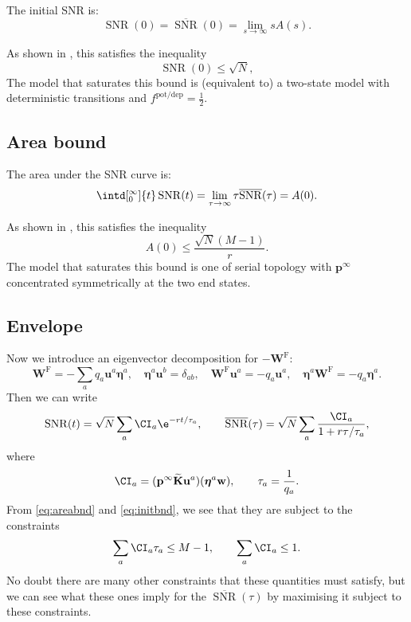 \documentclass[12pt]{article}
\newcommand{\pr}{\mathbf{p}}
\newcommand{\eq}{\pr^\infty}
\newcommand{\w}{\mathbf{w}}
\newcommand{\W}{\mathbf{W}}
\newcommand{\enc}{\mathbf{K}}
\newcommand{\frg}{\W^{\mathrm{F}}}
\newcommand{\potdep}{^{\text{pot/dep}}}
\newcommand{\ench}{\widetilde{\enc}}
\newcommand{\evr}{\mathbf{u}}
\newcommand{\evl}{\boldsymbol{\eta}}
\DeclareMathOperator{\snr}{SNR}
\newcommand{\snrb}{\overline{\snr}}
\begin{document}
The initial SNR is:
%
\begin{equation}\label{eq:initdef}
  \snr(0) = \snrb(0) = \lim_{s\to\infty} sA(s).
\end{equation}
%

As shown in \cite{Lahiri2013synapse}, this satisfies the inequality
%
\begin{equation}\label{eq:initbnd}
  \snr(0) \leq \sqrt{N},
\end{equation}
%
The model that saturates this bound is (equivalent to) a two-state model with deterministic transitions and $f\potdep=\frac{1}{2}$.

\subsection{Area bound}\label{sec:area}

The area under the SNR curve is:
%
\begin{equation}\label{eq:areadef}
  \intd[_0^\infty]{t} \snr(t) = \lim_{\tau\to\infty} \tau \snrb(\tau) = A(0).
\end{equation}
%

As shown in \cite{Lahiri2013synapse}, this satisfies the inequality
%
\begin{equation}\label{eq:areabnd}
  A(0) \leq \frac{\sqrt{N}(M-1)}{r}.
\end{equation}
%
The model that saturates this bound is one of serial topology with $\eq$ concentrated symmetrically at the two end states.



\subsection{Envelope}\label{sec:envelope}

Now we introduce an eigenvector decomposition for $-\frg$:
%
\begin{equation}\label{eq:eigendecomp}
  \frg = - \sum_a q_a \evr^a \evl^a,
  \quad
  \evl^a \evr^b = \delta_{ab},
  \quad
  \frg \evr^a = -q_a \evr^a,
  \quad
  \evl^a \frg = -q_a \evl^a.
\end{equation}
%
Then we can write
%
\begin{equation}\label{eqsnreig}
  \snr(t) = \sqrt{N}\sum_a \CI_a \e^{-rt/\tau_a},
  \qquad
  \snrb(\tau) = \sqrt{N}\sum_a \frac{\CI_a}{1+r\tau/\tau_a},
\end{equation}
%
where
%
\begin{equation}\label{eq:snrcoeffs}
  \CI_a = (\eq \ench \evr^a) (\evl^a \w),
  \qquad
  \tau_a = \frac{1}{q_a}.
\end{equation}
%
From \eqref{eq:areabnd} and \eqref{eq:initbnd}, we see that they are subject to the constraints
%
\begin{equation}\label{eq:coeffconstr}
  \sum_a \CI_a \tau_a \leq M-1,
  \qquad
  \sum_a \CI_a \leq 1.
\end{equation}
%
No doubt there are many other constraints that these quantities must satisfy, but we can see what these ones imply for the $\snrb(\tau)$ by maximising it subject to these constraints.
\end{document}
